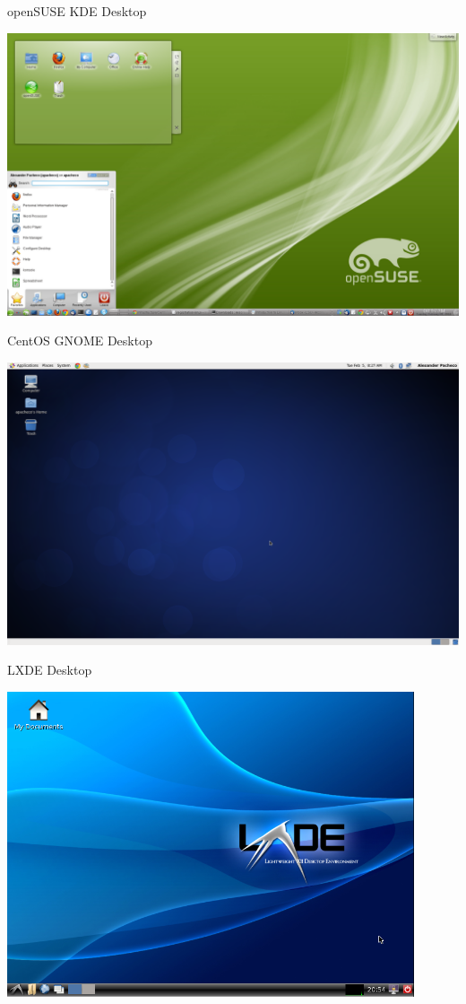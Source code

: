 \documentclass[c,compress,xcolor=svgnames]{beamer}
\begin{document}
\begin{frame}{\small openSUSE KDE Desktop}
  \begin{center}
    \includegraphics[width=\textwidth]{./opensuse}
  \end{center}
\end{frame}
\begin{frame}{\small CentOS GNOME Desktop}
  \begin{center}
    \includegraphics[width=\textwidth]{./CentOS6_3}
  \end{center}
\end{frame}
\begin{frame}{\small LXDE Desktop}
  \begin{center}
    \includegraphics[width=0.9\textwidth]{./LXDE_desktop_full}
  \end{center}
\end{frame}
\end{document}
